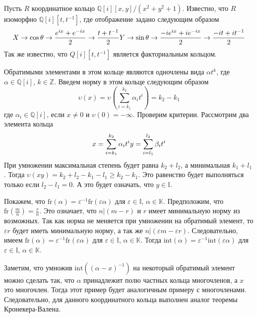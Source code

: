 \documentclass[_00_autoref.tex]{subfiles}
\begin{document}
\begin{example}\label{example:coordinate_ring_of_circle}
    Пусть $R$ координатное кольцо $\mathbb{Q}[i][x, y]/(x^2 + y^2 + 1)$.
    Известно, что $R$ изоморфно $\mathbb{Q}[i][t,  t^{-1}]$, где отображение задано следующим образом
    \begin{equation*}
        X \to \cos \theta \to \frac{e^{ix} + e^{-ix}}{2} \to \frac{t + t^{-1}}{2}\\
        Y \to \sin \theta \to \frac{-ie^{ix} + ie^{-ix}}{2} \to \frac{-it + it^{-1}}{2}
    \end{equation*}
    Так же известно, что $Q[i][t, t^{-1}]$ является факториальным кольцом.
    
    Обратимыми элементами в этом кольце  являются одночлены вида $\alpha t^k$, где $\alpha\in\mathbb{Q}[i]$, $k\in\mathbb{Z}$.
    Введем норму в этом кольце следующим образом
    \begin{equation*}
        \upsilon(x) = \upsilon\left(
            \sum_{i=k_1}^{k_2} \alpha_i t^i
        \right) = k_2 - k_1
    \end{equation*}
    где $\alpha_i\in\mathbb{Q}[i]$, если $x \neq 0$ и $\upsilon(0) = -\infty$.
    Проверим критерии.
    Рассмотрим два элемента кольца
    \begin{equation*}
        x = \sum_{i=k_1}^{k_2} \alpha_i t^i\\
        y = \sum_{i=l_1}^{l_2} \beta_i t^i
    \end{equation*}
    При  умножении максимальная степень будет равна $k_2 + l_2$, а минимальная $k_1 + l_1$.
    Тогда $\upsilon(xy) = k_2 + l_2 - k_1 - l_1 \ge k_2 - k_1$.
    Это равенство будет выполняться только если $l_2 - l_1 = 0$.
    А это будет означать, что $y\in\mathbb{I}$.
    
    Покажем, что $\textrm{fr}(\alpha) = \varepsilon^{-1}\textrm{fr}(\varepsilon\alpha)$ для $\varepsilon\in\mathbb{I}$, $\alpha\in\mathbb{K}$.
    Предположим, что $\textrm{fr}\left(\frac{m}{n}\right) = \frac{r}{n}$.
    Это означает, что $n | (m-r)$ и $r$ имеет минимальную норму из возможных.
    Так как норма не меняется при умножении на обратимый элемент, то $\varepsilon r$ будет иметь минимальную норму, а так же $n | (\varepsilon m - \varepsilon r)$.
    Следовательно, имеем $\textrm{fr}(\alpha) = \varepsilon^{-1}\textrm{fr}(\varepsilon\alpha)$ для $\varepsilon\in\mathbb{I}$, $\alpha\in\mathbb{K}$.
    Тогда $\textrm{int}(\alpha) = \varepsilon^{-1}\textrm{int}(\varepsilon\alpha)$ для $\varepsilon\in\mathbb{I}$, $\alpha\in\mathbb{K}$.
    
    Заметим, что умножив $\textrm{int}((\alpha-x)^{-1})$ на некоторый обратимый элемент можно сделать так, что $\alpha$ принадлежит полю частных кольца многочленов, а $x$ это многочлен.
    Тогда этот пример будет аналогичным примеру с многочленами.
    Следовательно, для данного координатного кольца выполнен аналог теоремы Кронекера-Валена.
\end{example}
\end{document}
